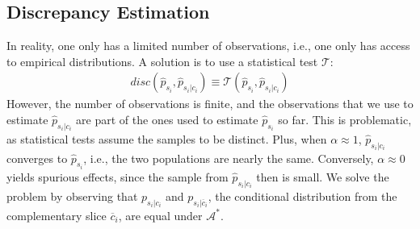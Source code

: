 \subsection{Discrepancy Estimation}

In reality, one only has a limited number of observations, i.e., one only has access to empirical distributions. 
A solution is to use a statistical test $\mathcal{T}$: 
\begin{align}
disc \left ( 
\hat{p}_{s_i} , \hat{p}_{s_i | {c_i}}
\right ) \equiv 
\mathcal{T}\left( \hat{p}_{s_i}, \hat{p}_{s_i | {c_i}} \right )
\end{align}
However, the number of observations is finite, and the observations that we use to estimate $\hat{p}_{s_i | {c_i}}$
are part of the ones used to estimate $\hat{p}_{s_i}$ so far. 
This is problematic, as statistical tests assume the samples to be distinct. Plus, when $\alpha \approx 1$, $\hat{p}_{s_i | {c_i}}$ converges to $\hat{p}_{s_i}$, i.e., the two populations are nearly the same. 
Conversely, $\alpha \approx 0$ yields spurious effects, since the sample from $\hat{p}_{s_i | {c_i}}$ then is small. 
We solve the problem by observing that $p_{s_i | {c_i}}$ and $p_{s_i | {\overline{c}_i}}$, the conditional distribution from the complementary slice $\overline{c}_i$, are equal under $\mathcal{A}^*$.  

